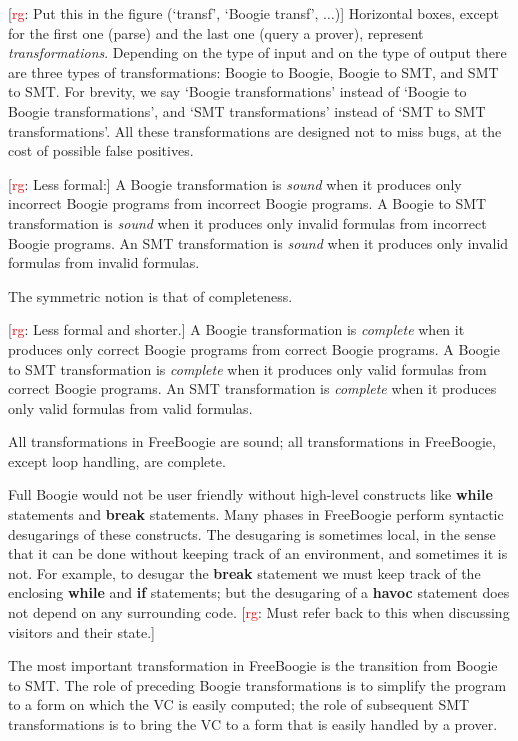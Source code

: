 \documentclass{llncs}
\newcommand{\rg}[1]{{\small [\textcolor{red}{rg}: #1]}}
\begin{document}
\rg{Put this in the figure (`transf', `Boogie transf', $\ldots$)}
Horizontal boxes, except for the first one (parse) and the last
one (query a prover), represent \emph{transformations}. Depending
on the type of input and on the type of output there are three
types of transformations: Boogie to Boogie, Boogie to SMT, and
SMT to SMT\null. For brevity, we say `Boogie transformations'
instead of `Boogie to Boogie transformations', and `SMT
transformations' instead of `SMT to SMT transformations'. All
these transformations are designed not to miss bugs, at the cost
of possible false positives.

\rg{Less formal:}
A Boogie transformation is \emph{sound} when it produces only
incorrect Boogie programs from incorrect Boogie programs. A
Boogie to SMT transformation is \emph{sound} when it produces
only invalid formulas from incorrect Boogie programs. An SMT
transformation is \emph{sound} when it produces only invalid
formulas from invalid formulas.

The symmetric notion is that of completeness.

\rg{Less formal and shorter.}
A Boogie transformation is \emph{complete} when it produces
only correct Boogie programs from correct Boogie programs. A
Boogie to SMT transformation is \emph{complete} when it produces
only valid formulas from correct Boogie programs. An SMT
transformation is \emph{complete} when it produces only valid
formulas from valid formulas.

All transformations in FreeBoogie are sound; all transformations
in FreeBoogie, except loop handling, are complete.

Full Boogie would not be user friendly without high-level
constructs like \textbf{while} statements and \textbf{break}
statements. Many phases in FreeBoogie perform syntactic
desugarings of these constructs. The desugaring is sometimes
local, in the sense that it can be done without keeping track of
an environment, and sometimes it is not. For example, to desugar
the \textbf{break} statement we must keep track of the enclosing
\textbf{while} and \textbf{if} statements; but the desugaring of
a \textbf{havoc} statement does not depend on any surrounding
code. \rg{Must refer back to this when discussing visitors and their state.}

The most important transformation in FreeBoogie is the
transition from Boogie to SMT\null. The role of preceding Boogie
transformations is to simplify the program to a form on which the
VC is easily computed; the role of subsequent SMT transformations
is to bring the VC to a form that is easily handled by a prover.
\end{document}
